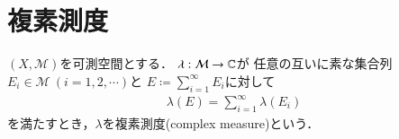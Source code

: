 \section{複素測度}

	\begin{screen}
		\begin{dfn}[複素測度]
			$(X,\mathcal{M})$を可測空間とする．
			$\lambda: \mathcal{M} \rightarrow \mathbb{C}$が
			任意の互いに素な集合列$E_i \in \mathcal{M}\ (i=1,2,\cdots)$と
			$E \coloneqq \sum_{i=1}^{\infty} E_i$に対して
			\begin{align}
				\lambda(E) = \sum_{i=1}^{\infty} \lambda(E_i)
				\label{eq:dfn_complex_measure}
			\end{align}
			を満たすとき，$\lambda$を複素測度(complex measure)という．
		\end{dfn}
	\end{screen}
	
